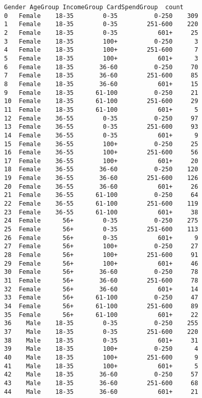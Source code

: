 \documentclass[11pt]{article}
\begin{document}
    \begin{Verbatim}[commandchars=\\\{\}]
    Gender AgeGroup IncomeGroup CardSpendGroup  count
0   Female    18-35        0-35          0-250    309
1   Female    18-35        0-35        251-600    220
2   Female    18-35        0-35           601+     25
3   Female    18-35        100+          0-250      3
4   Female    18-35        100+        251-600      7
5   Female    18-35        100+           601+      3
6   Female    18-35       36-60          0-250     70
7   Female    18-35       36-60        251-600     85
8   Female    18-35       36-60           601+     15
9   Female    18-35      61-100          0-250     21
10  Female    18-35      61-100        251-600     29
11  Female    18-35      61-100           601+      5
12  Female    36-55        0-35          0-250     97
13  Female    36-55        0-35        251-600     93
14  Female    36-55        0-35           601+      9
15  Female    36-55        100+          0-250     25
16  Female    36-55        100+        251-600     56
17  Female    36-55        100+           601+     20
18  Female    36-55       36-60          0-250    120
19  Female    36-55       36-60        251-600    126
20  Female    36-55       36-60           601+     26
21  Female    36-55      61-100          0-250     64
22  Female    36-55      61-100        251-600    119
23  Female    36-55      61-100           601+     38
24  Female      56+        0-35          0-250    275
25  Female      56+        0-35        251-600    113
26  Female      56+        0-35           601+      9
27  Female      56+        100+          0-250     27
28  Female      56+        100+        251-600     91
29  Female      56+        100+           601+     46
30  Female      56+       36-60          0-250     78
31  Female      56+       36-60        251-600     78
32  Female      56+       36-60           601+     14
33  Female      56+      61-100          0-250     47
34  Female      56+      61-100        251-600     89
35  Female      56+      61-100           601+     22
36    Male    18-35        0-35          0-250    255
37    Male    18-35        0-35        251-600    220
38    Male    18-35        0-35           601+     31
39    Male    18-35        100+          0-250      4
40    Male    18-35        100+        251-600      9
41    Male    18-35        100+           601+      5
42    Male    18-35       36-60          0-250     57
43    Male    18-35       36-60        251-600     68
44    Male    18-35       36-60           601+     21

\end{Verbatim}
\end{document}
